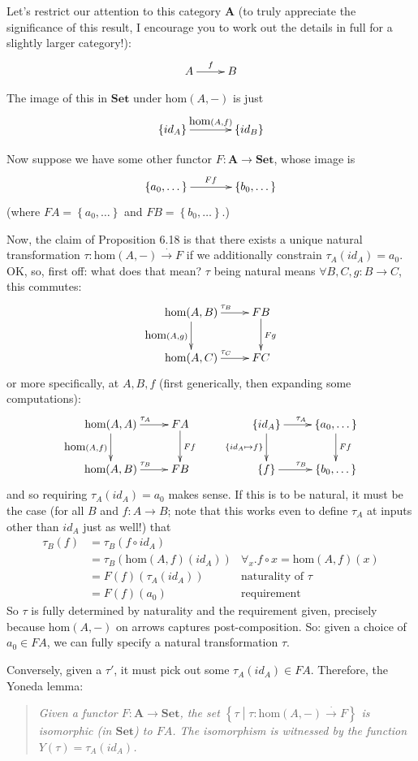 \documentclass[10pt,letterpaper]{article}
\newcommand{\set}[1]{\left\{#1\right\}}
\begin{document}
Let's restrict our attention to this category $\mathbf{A}$
(to truly appreciate the significance of this result, I encourage you to work out
the details in full for a slightly larger category!):
\[ \xymatrix{ A \ar[r]^f & B } \]

The image of this in $\mathbf{Set}$ under $\mbox{hom}(A,-)$ is just
\[ \xymatrix@C=.5in{ \set{id_A} \ar[r]^{\mbox{hom}(A,f)} & \set{id_B} } \]

Now suppose we have some other functor $F : \mathbf{A} \to \mathbf{Set}$,
whose image is
\[ \xymatrix@C=.5in{ \set{a_0, \dots} \ar[r]^{Ff} & \set{b_0, \dots} } \]
(where $FA = \set{a_0, \dots}$ and $FB = \set{b_0, \dots}$.)

Now, the claim of Proposition 6.18 is that there exists a unique natural
transformation $\tau : \mbox{hom}(A,-) \stackrel{\cdot}{\to} F$ if we additionally
constrain $\tau_A(id_A) = a_0$.  OK, so, first off: what does that mean? $\tau$ being
natural means $\forall B,C,g : B \to C$, this commutes:
\[ \xymatrix{
  \mbox{hom}(A,B) \ar[r]^{\tau_B} \ar[d]_{\mbox{hom}(A,g)} & FB \ar[d]^{Fg} \\
  \mbox{hom}(A,C) \ar[r]^{\tau_C} & FC 
} \]
or more specifically, at $A,B,f$ (first generically, then expanding some computations):
\[ \xymatrix{
  \mbox{hom}(A,A) \ar[r]^{\tau_A} \ar[d]_{\mbox{hom}(A,f)} & FA \ar[d]^{Ff} \\
  \mbox{hom}(A,B) \ar[r]^{\tau_B} & FB 
} \qquad \xymatrix{
  \set{id_A} \ar[r]^{\tau_A} \ar[d]_{\set{id_A \mapsto f}} & \set{a_0,\dots} \ar[d]^{Ff} \\
  \set{f} \ar[r]^{\tau_B} & \set{b_0,\dots}
} \]
and so requiring $\tau_A(id_A) = a_0$ makes sense.  If this is to be natural, it
must be the case (for all $B$ and $f : A \to B$; note that this works even to
define $\tau_A$ at inputs other than $id_A$ just as well!) that
\begin{align*}
  \tau_B(f) &= \tau_B(f \circ id_A) \\
            &= \tau_B(\mbox{hom}(A,f)(id_A)) & \forall_x . f \circ x = \mbox{hom}(A,f)(x) \\
            &= F(f)(\tau_A(id_A))            & \text{naturality of $\tau$} \\
            &= F(f)(a_0)                     & \text{requirement}
\end{align*}
So $\tau$ is fully determined by naturality and the requirement given,
precisely because $\mbox{hom}(A,-)$ on arrows captures post-composition.
So: given a choice of $a_0 \in FA$, we can fully specify a natural transformation $\tau$.


Conversely, given a $\tau'$, it must pick out some $\tau_A(id_A) \in FA$.  Therefore,
the Yoneda lemma:

\begin{quote}{\em
  Given a functor $F : \mathbf{A} \to \mathbf{Set}$, the set
  $\set{\tau \middle\vert \tau : \mbox{hom}(A,-) \stackrel{\cdot}{\to} F}$
  is isomorphic (in $\mathbf{Set}$) to $FA$.
  The isomorphism is witnessed by the function $Y(\tau) = \tau_A(id_A)$.
}\end{quote}
\end{document}
